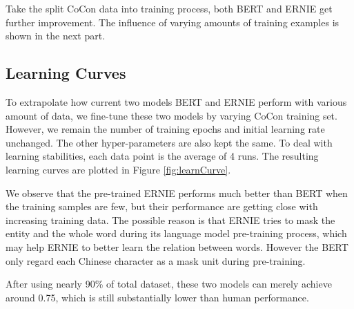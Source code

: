 
Take the split CoCon data into training process, both BERT and ERNIE get further improvement. The influence of varying amounts of training examples is shown in the next part. %



\subsection{Learning Curves}


To extrapolate how current two models BERT and ERNIE perform with various amount of data, we fine-tune these two models by varying CoCon training set. However, we remain the number of training epochs and initial learning rate unchanged. The other hyper-parameters are also kept the same. To deal with learning stabilities, each data point is the average of 4 runs. The resulting learning curves are plotted in Figure \ref{fig:learnCurve}. 

We observe that the pre-trained ERNIE performs much better than BERT when the training samples are few, but their performance are getting close with increasing training data. 
The possible reason is that ERNIE tries to mask the entity and the whole word during its language model pre-training process, which may help ERNIE to better learn the relation between words. However the BERT only regard each Chinese character as a mask unit during pre-training. 


After using nearly 90\% of total dataset, these two models can merely achieve around 0.75, which is still substantially lower than human performance.


